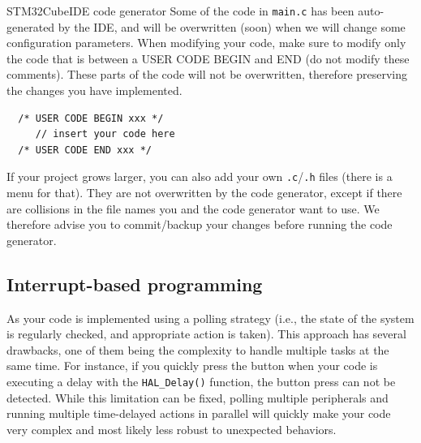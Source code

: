 \begin{bclogo}[couleur = gray!20, arrondi = 0.2, logo=\bcattention]{STM32CubeIDE code generator}
Some of the code in \texttt{main.c} has been auto-generated by the IDE, and will be overwritten (soon) when we will change some configuration parameters.
When modifying your code, make sure to modify only the code that is between a USER CODE BEGIN and END (do not modify these comments). These parts of the code will not be overwritten, therefore preserving the changes you have implemented.
\begin{lstlisting}
  /* USER CODE BEGIN xxx */
     // insert your code here
  /* USER CODE END xxx */
\end{lstlisting}

If your project grows larger, you can also add your own \texttt{.c}/\texttt{.h} files (there is a menu for that). They are not overwritten by the code generator, except if there are collisions in the file names you and the code generator want to use. We therefore advise you to commit/backup your changes before running the code generator.
\end{bclogo}






\subsection{Interrupt-based programming}

As your code is implemented using a polling strategy (i.e., the state of the system is regularly checked, and appropriate action is taken). This approach has several drawbacks, one of them being the complexity to handle multiple tasks at the same time. For instance, if you quickly press the button when your code is executing a delay with the \texttt{HAL\_Delay()} function, the button press can not be detected. While this limitation can be fixed, polling multiple peripherals and running multiple time-delayed actions in parallel will quickly make your code very complex and most likely less robust to unexpected behaviors.


